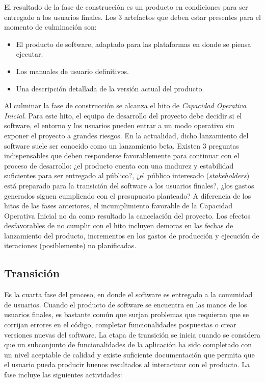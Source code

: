 El resultado de la fase de construcción es un producto en condiciones para ser entregado a los usuarios finales. Los 3 artefactos que deben estar presentes para el momento de culminación son:

\begin{itemize}
    \item El producto de software, adaptado para las plataformas en donde se piensa ejecutar.
    \item Los manuales de usuario definitivos.
    \item Una descripción detallada de la versión actual del producto.
\end{itemize}

Al culminar la fase de construcción se alcanza el hito de \textit{Capacidad Operativa Inicial}. Para este hito, el equipo de desarrollo del proyecto debe decidir si el software, el entorno y los usuarios pueden entrar a un modo operativo sin exponer el proyecto a grandes riesgos. En la actualidad, dicho lanzamiento del software suele ser conocido como un lanzamiento beta. Existen 3 preguntas indispensables que deben responderse favorablemente para continuar con el proceso de desarrollo: ¿el producto cuenta con una madurez y estabilidad suficientes para ser entregado al público?, ¿el público interesado (\textit{stakeholders}) está preparado para la transición del software a los usuarios finales?, ¿los gastos generados siguen cumpliendo con el presupuesto planteado? A diferencia de los hitos de las fases anteriores, el incumplimiento favorable de la Capacidad Operativa Inicial no da como resultado la cancelación del proyecto. Los efectos desfavorables de no cumplir con el hito incluyen demoras en las fechas de lanzamiento del producto, incrementos en los gastos de producción y ejecución de iteraciones (posiblemente) no planificadas.

\subsection{Transición}
Es la cuarta fase del proceso, en donde el software es entregado a la comunidad de usuarios. \cite{rupKruchten} Cuando el producto de software se encuentra en las manos de los usuarios finales, es bastante común que surjan problemas que requieran que se corrijan errores en el código, completar funcionalidades pospuestas o crear versiones nuevas del software. La etapa de transición se inicia cuando se considera que un subconjunto de funcionalidades de la aplicación ha sido completado con un nivel aceptable de calidad y existe suficiente documentación que permita que el usuario pueda producir buenos resultados al interactuar con el producto. La fase incluye las siguientes actividades:

